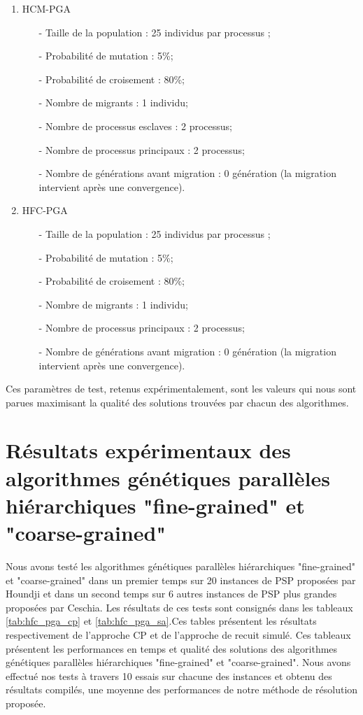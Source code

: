 		\begin{enumerate}
			\item HCM-PGA \\
				\begin{itemize}
					\item[-] Taille de la population : 25 individus par processus ;
			        \item[-] Probabilité de mutation : 5\%;
			        \item[-] Probabilité de croisement : 80\%;
			        \item[-] Nombre de migrants : 1 individu;
		 	        \item[-] Nombre de processus esclaves : 2 processus;
			        \item[-] Nombre de processus principaux : 2 processus;
			        \item[-] Nombre de générations avant migration : 0 génération (la migration intervient après une convergence).
				\end{itemize}
				\vspace*{.5cm}
			\item HFC-PGA \\
				\begin{itemize}
					\item[-] Taille de la population : 25 individus par processus ;
			        \item[-] Probabilité de mutation : 5\%;
			        \item[-] Probabilité de croisement : 80\%;
			        \item[-] Nombre de migrants : 1 individu;
			        \item[-] Nombre de processus principaux : 2 processus;
			        \item[-] Nombre de générations avant migration : 0 génération (la migration intervient après une convergence).
				\end{itemize}
		\end{enumerate}
		Ces paramètres de test, retenus expérimentalement, sont les valeurs qui nous sont parues maximisant la qualité des solutions trouvées par chacun des algorithmes.		
		
		\section{Résultats expérimentaux des algorithmes génétiques parallèles hiérarchiques "fine-grained" et "coarse-grained"}
		Nous avons testé les algorithmes génétiques parallèles hiérarchiques "fine-grained" et "coarse-grained" dans un premier temps sur 20 instances de PSP proposées par Houndji et dans un second temps sur 6 autres instances de PSP plus grandes proposées par Ceschia. Les résultats de ces tests sont consignés dans les tableaux \ref{tab:hfc_pga_cp} et \ref{tab:hfc_pga_sa}.Ces tables présentent les résultats respectivement de l'approche CP et de l'approche de recuit simulé. Ces tableaux présentent les performances en temps et qualité des solutions des algorithmes génétiques parallèles hiérarchiques "fine-grained" et "coarse-grained". Nous avons effectué nos tests à travers 10 essais sur chacune des instances et obtenu des résultats compilés, une moyenne des performances de notre méthode de résolution proposée.
		
